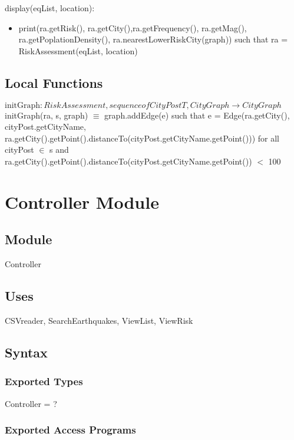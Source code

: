 \documentclass[12pt]{article}
\begin{document}
\noindent display(eqList, location):
\begin{itemize}
\item print(ra.getRisk(), ra.getCity(),ra.getFrequency(), ra.getMag(), ra.getPoplationDensity(), ra.nearestLowerRiskCity(graph)) such that ra = RiskAssessment(eqList, location)\\
\end{itemize}

\subsection*{Local Functions}
\noindent $\text{initGraph}: RiskAssessment, sequence of CityPostT, CityGraph \rightarrow CityGraph$\\
\noindent initGraph(ra, s, graph) $\equiv$ graph.addEdge(e) such that e = Edge(ra.getCity(), cityPost.getCityName, ra.getCity().getPoint().distanceTo(cityPost.getCityName.getPoint())) for all cityPost $\in$ s and ra.getCity().getPoint().distanceTo(cityPost.getCityName.getPoint()) $<$ 100\\




\newpage

\section* {Controller Module}

\subsection* {Module}

Controller

\subsection* {Uses}

CSVreader, SearchEarthquakes, ViewList, ViewRisk

\subsection* {Syntax}

\subsubsection* {Exported Types}

Controller = ?

\subsubsection* {Exported Access Programs}
\end{document}
